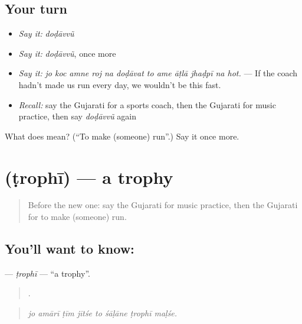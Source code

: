 \subsection*{Your turn}
\begin{itemize}
\raggedright
  \item \emph{Say it:} \emph{doḍāvvũ}
  \item \emph{Say it:} \emph{doḍāvvũ}, once more
  \item \emph{Say it:} \emph{jo koc amne roj na doḍāvat to ame āṭlā jhaḍpī na hot.} — If the coach hadn't made us run every day, we wouldn't be this fast.
  \item \emph{Recall:} say the Gujarati for a sports coach, then the Gujarati for music practice, then say \emph{doḍāvvũ} again
\end{itemize}

\begin{tcolorbox}[breakable,colback=teal!4,colframe=teal!35!black,title={Before you move on}]
What does  mean? (\textquotedblleft{}To make (someone) run\textquotedblright{}.) Say it once more.
\end{tcolorbox}
\section[\texorpdfstring{\gu{ટ્રોફી} (ṭrophī)}{ટ્રોફી (ṭrophī)}]{ (ṭrophī) — a trophy}

\label{lesson:GU-C551-trophi}



\begin{quote}
Before the new one: say the Gujarati for music practice, then the Gujarati for to make (someone) run.
\end{quote}

\subsection*{You'll want to know: }
\textbf{} — \emph{ṭrophī} — \textquotedblleft{}a trophy\textquotedblright{}.

\begin{quote}
       .
\end{quote}

\begin{quote}
\emph{jo amārī ṭīm jītśe to śāḷāne ṭrophī maḷśe.}
\end{quote}

